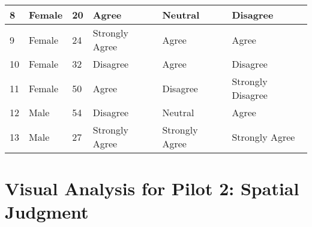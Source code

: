\begin{appendices}
\begin{table}[]
\begin{tabular}{|l|l|l|l|l|l|}
		8                       & Female          & 20           & Agree                                                             & Neutral                           & Disagree                                  \\ \hline
		9                       & Female          & 24           & Strongly Agree                                                    & Agree                             & Agree                                     \\ \hline
		10                      & Female          & 32           & Disagree                                                          & Agree                             & Disagree                                  \\ \hline
		11                      & Female          & 50           & Agree                                                             & Disagree                          & Strongly Disagree                         \\ \hline
		12                      & Male            & 54           & Disagree                                                          & Neutral                           & Agree                                     \\ \hline
		13                      & Male            & 27           & Strongly Agree                                                    & Strongly Agree                    & Strongly Agree                            \\ \hline
	\end{tabular}
\end{table}	

\chapter{Visual Analysis for Pilot 2: Spatial Judgment}
\label{app:pilot2visual_analysis}

\begin{figure}
	
	\hfill
	\par\smallskip
	\hfill
	\par\smallskip
	\hfill
\end{figure}
\begin{figure}	
	

\end{figure}
\end{appendices}
